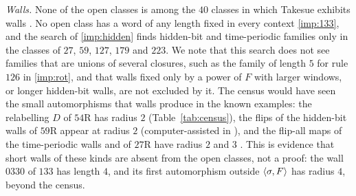 \emph{Walls.} None of the open classes is among the $40$ classes in which Takesue exhibits walls \cite[Section~4]{Takesue1989}. No open class has a word of any length fixed in every context \eqref{imp:133}, and the search of \eqref{imp:hidden} finds hidden-bit and time-periodic families only in the classes of $27$, $59$, $127$, $179$ and $223$. We note that this search does not see families that are unions of several closures, such as the family of length $5$ for rule $126$ in \eqref{imp:rot}, and that walls fixed only by a power of $F$ with larger windows, or longer hidden-bit walls, are not excluded by it. The census would have seen the small automorphisms that walls produce in the known examples: the relabelling $D$ of $54$R has radius $2$ (Table~\ref{tab:census}), the flips of the hidden-bit walls of $59$R appear at radius $2$ (computer-assisted in \cite{PaperC}), and the flip-all maps of the time-periodic walls and of $27$R have radius $2$ and $3$ \cite{PaperC}. This is evidence that short walls of these kinds are absent from the open classes, not a proof: the wall $0330$ of $133$ has length $4$, and its first automorphism outside $\langle\sigma,F\rangle$ has radius $4$, beyond the census.

